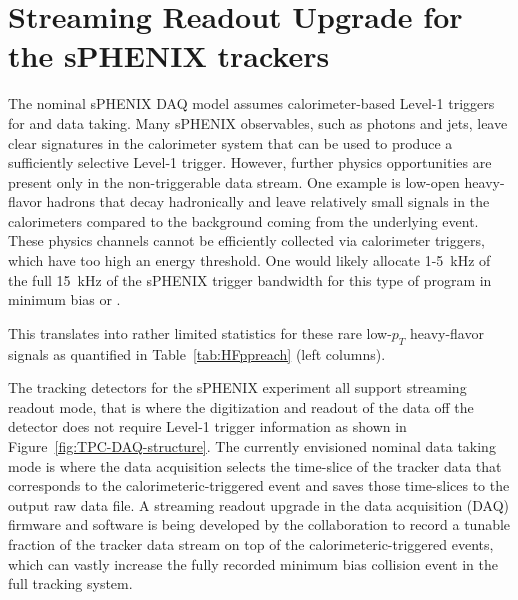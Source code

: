 
\section{Streaming Readout Upgrade for the sPHENIX trackers}

The nominal sPHENIX DAQ model assumes calorimeter-based Level-1
triggers for \pp and \pau data taking.  Many sPHENIX observables, such
as photons and jets, leave clear signatures in the calorimeter system
that can be used to produce a sufficiently selective Level-1 trigger.
However, further physics opportunities are present only in the
non-triggerable data stream.  One example is low-\pt open heavy-flavor
hadrons that decay hadronically and leave relatively small signals in
the calorimeters compared to the background coming from the underlying
event.  These physics channels cannot be efficiently collected via
calorimeter triggers, which have too high an energy threshold.
One would likely allocate 1-5~kHz of the full 15~kHz of the sPHENIX
trigger bandwidth for this type of program in minimum bias \pp or
\pau.

This translates into rather limited statistics for these rare
low-$p_T$ heavy-flavor signals as quantified in
Table~\ref{tab:HFppreach} (left columns).

The tracking detectors for the sPHENIX experiment all support
streaming readout mode, that is where the digitization and readout of
the data off the detector does not require Level-1 trigger information
as shown in Figure~\ref{fig:TPC-DAQ-structure}. The currently
envisioned nominal data taking mode is where the data acquisition
selects the time-slice of the tracker data that corresponds to the
calorimeteric-triggered event and saves those time-slices to the
output raw data file.  A streaming readout upgrade in the data
acquisition (DAQ) firmware and software is being developed by the
collaboration to record a tunable fraction of the tracker data stream
on top of the calorimeteric-triggered events, which can vastly
increase the fully recorded minimum bias collision event in the full
tracking system.

